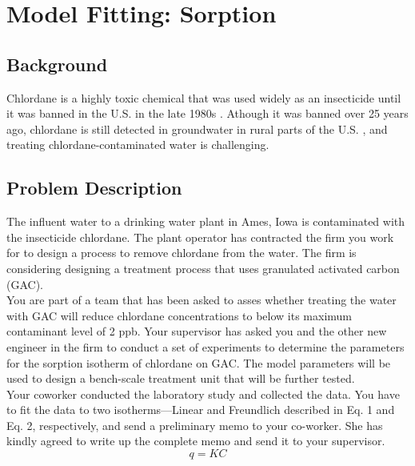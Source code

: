 \documentclass[12pt,letterpaper]{article}
\begin{document}
\section *{Model Fitting: Sorption}

\subsection *{Background}
Chlordane is a highly toxic chemical that was used widely as an insecticide until it was banned in the U.S. in the late 1980s \cite{army2009}.  Athough it was banned over 25 years ago, chlordane is still detected in groundwater in rural parts of the U.S. \cite{bidel2004}, and treating chlordane-contaminated water is challenging.

\subsection *{Problem Description}
The influent water to a drinking water plant in Ames, Iowa is contaminated with the insecticide chlordane. The plant operator has contracted the firm you work for to design a  process to remove chlordane from the water. The firm is considering designing a treatment process that uses granulated activated carbon (GAC).\\

You are part of a team that has been asked to asses whether treating the water with GAC will reduce chlordane concentrations to below its maximum contaminant level of 2 ppb. Your supervisor has asked you and the other new engineer in the firm to conduct a set of experiments to determine the parameters for the sorption isotherm of chlordane on GAC.  The model  parameters will be used to design a bench-scale treatment unit that will be further tested.\\

Your coworker conducted the laboratory study and collected the data. You have to fit the data to two isotherms---Linear and Freundlich described in Eq. 1 and Eq. 2, respectively, and send a preliminary memo to your co-worker.  She has kindly agreed to write up the complete memo and send it to your supervisor.\\

\begin{equation}
q = KC
\end{equation}
\end{document}
